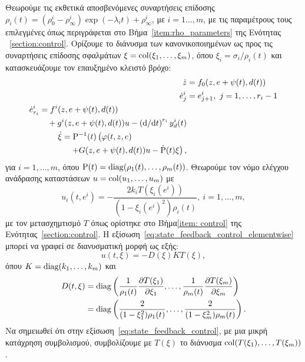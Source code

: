 Θεωρούμε τις εκθετικά αποσβενόμενες συναρτήσεις επίδοσης $\rho_i(t) = (\rho_0^i - \rho_\infty^i) \exp(- \lambda_i t) + \rho_\infty^i$, με $i=1 \ldots, m$, με τις παραμέτρους τους επιλεγμένες όπως περιγράφεται στο Βήμα~\ref{item:rho_parameters} της Ενότητας ~\ref{section:control}. Ορίζουμε το διάνυσμα των κανονικοποιημένων ως προς τις συναρτήσεις επίδοσης σφαλμάτων $\xi = \operatorname{col}(\xi_1, \ldots, \xi_m)$, όπου $\xi_i = \sigma_i/\rho_i(t)$ και κατασκευάζουμε τον επαυξημένο κλειστό βρόχο:
\begin{subequations}
    \label{eq:sys3}
    \begin{align}
        \dot z &= f_0(z, e + \psi(t), d(t))\\
        \dot e_j^i &= e_{j+1}^i,\ j = 1,\ldots,r_i-1\\
        \begin{split}
            \dot e_{r_i}^i &= f^i(z,e + \psi(t),d(t)) \\
                &\quad + g^i(z,e + \psi(t),d(t))u - \ddt^{r_i} y_d^i(t)
        \end{split}\\
        \begin{split}
            \dot \xi &= \Rho^{-1}(t) \left(
                \varphi(t,z,e) \vphantom{\dot \Rho} \right. \\
                & \quad \left. + G(z, e + \psi(t), d(t))u 
                - \dot \Rho(t)\xi \right),
        \end{split}
    \end{align}
\end{subequations}
για $i = 1, \ldots, m$, όπου $\mathrm{P}(t) = \operatorname{diag}(\rho_1(t), \ldots, \rho_m(t))$. Θεωρούμε τον νόμο ελέγχου ανάδρασης καταστάσεων  $u = \operatorname{col}(u_1, \ldots, u_m)$ με 
\begin{equation}
\label{eq:state_feedback_control_elementwise}
    u_i(t, e^i) = - \frac{2 k_i T(\xi_i(e^i))}
    {\left(1- {\xi_i(e^i)}^2\right)\rho_i(t)},\ i = 1, \ldots, m,
\end{equation}
με τον μετασχημτισμό $T$ όπως ορίστηκε στο Βήμα\ref{item: control} της Ενότητας~\ref{section:control}. Η εξίσωση~\eqref{eq:state_feedback_control_elementwise} μπορεί να γραφεί σε διανυσματική μορφή ως εξής:
\begin{equation}
\label{eq:state_feedback_control}
    u(t, \xi) = - D(\xi)K T(\xi),
\end{equation}
όπου $K = \operatorname{diag}(k_1, \ldots, k_m)$ και
\begin{align*}
    D(t, \xi) &= \operatorname{diag} \left( \frac{1}{\rho_1(t)} \frac{\partial T(\xi_1)}
        {\partial \xi_1}, \ldots, \frac{1}{\rho_m(t)} \frac{\partial T(\xi_m)}
        {\partial \xi_m} \right) \\
    &= \operatorname{diag} \left( \frac{2}{(1 - \xi_1^2)\rho_1(t)}, \ldots, 
        \frac{2}{(1-\xi_m^2)\rho_m(t)} \right).   
\end{align*}
Να σημειωθεί ότι στην εξίσωση~\eqref{eq:state_feedback_control}, με μια μικρή κατάχρηση συμβολισμού, συμβολίζουμε με $T(\xi)$ το διάνυσμα $\operatorname{col}(T(\xi_1), \ldots, T(\xi_m))$. 

